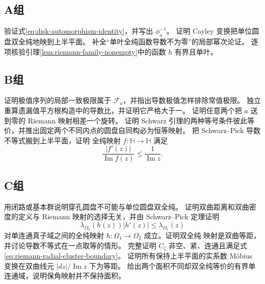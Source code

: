 \subsection*{A组}
\begin{enumerate}[label=\textbf{\thechapter.\arabic*.}]
验证式\eqref{eq:disk-automorphism-identity}，并写出 $\phi_a^{-1}$。
证明 Cayley 变换把单位圆盘双全纯地映到上半平面。
补全“单叶全纯函数导数不为零”的局部幂次论证。
逐项核验引理\ref{lem:riemann-family-nonempty}中的函数 $h$ 有界且单叶。
\end{enumerate}

\subsection*{B组}
\begin{enumerate}[label=\textbf{\thechapter.\arabic*.},resume]
证明极值序列的局部一致极限属于 $\mathcal F_a$，并指出导数极值怎样排除常值极限。
独立重算遗漏值平方根构造中的导数比，并证明它严格大于一。
证明任意两个把 $a$ 送到零的 Riemann 映射相差一个旋转。
证明 Schwarz 引理的两种等号条件彼此等价，并推出固定两个不同内点的圆盘自同构必为恒等映射。
把 Schwarz--Pick 导数不等式搬到上半平面，证明
全纯映射 $f:\mathbb H\to\mathbb H$ 满足
\[
 \frac{|f'(z)|}{\operatorname{Im}f(z)}
 \le \frac{1}{\operatorname{Im}z}.
\]
\end{enumerate}

\subsection*{C组}
\begin{enumerate}[label=\textbf{\thechapter.\arabic*.},resume]
用闭路或基本群说明穿孔圆盘不可能与单位圆盘双全纯。
证明双曲距离和双曲密度的定义与 Riemann 映射的选择无关，并由 Schwarz--Pick 定理证明
\[
 \lambda_{\Omega_2}(h(z))|h'(z)|\le\lambda_{\Omega_1}(z)
\]
对单连通真子域之间的全纯映射 \(h:\Omega_1\to\Omega_2\) 成立。证明双全纯
映射是双曲等距，并讨论导数不等式在一点取等的情形。
完整证明 $C_\zeta$ 非空、紧、连通且满足式\eqref{eq:riemann-radial-cluster-boundary}。
证明所有保持上半平面的实系数 M\"obius 变换在双曲线元 $|dz|/\operatorname{Im}z$ 下为等距。
给出两个面积不同却双全纯等价的有界单连通域，说明保角映射并不保持面积。
\end{enumerate}
